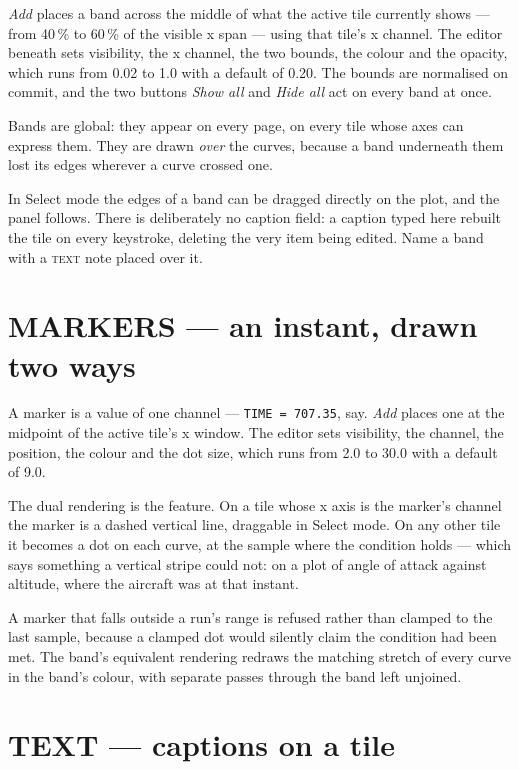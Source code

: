 \documentclass[11pt,a4paper,oneside]{report}
\newcommand{\code}[1]{\texttt{#1}}
\newcommand{\tab}[1]{\textsc{#1}}
\begin{document}
\emph{Add} places a band across the middle of what the active tile currently
shows --- from 40\,\% to 60\,\% of the visible x span --- using that tile's x
channel. The editor beneath sets visibility, the x channel, the two bounds, the
colour and the opacity, which runs from 0.02 to 1.0 with a default of 0.20. The
bounds are normalised on commit, and the two buttons \emph{Show all} and
\emph{Hide all} act on every band at once.

Bands are global: they appear on every page, on every tile whose axes can express
them. They are drawn \emph{over} the curves, because a band underneath them lost
its edges wherever a curve crossed one.

In Select mode the edges of a band can be dragged directly on the plot, and the
panel follows. There is deliberately no caption field: a caption typed here
rebuilt the tile on every keystroke, deleting the very item being edited. Name a
band with a \tab{text} note placed over it.

\section{MARKERS --- an instant, drawn two ways}

A marker is a value of one channel --- \code{TIME = 707.35}, say. \emph{Add}
places one at the midpoint of the active tile's x window. The editor sets
visibility, the channel, the position, the colour and the dot size, which runs
from 2.0 to 30.0 with a default of 9.0.

The dual rendering is the feature. On a tile whose x axis is the marker's channel
the marker is a dashed vertical line, draggable in Select mode. On any other tile
it becomes a dot on each curve, at the sample where the condition holds --- which
says something a vertical stripe could not: on a plot of angle of attack against
altitude, where the aircraft was at that instant.

A marker that falls outside a run's range is refused rather than clamped to the
last sample, because a clamped dot would silently claim the condition had been
met. The band's equivalent rendering redraws the matching stretch of every curve
in the band's colour, with separate passes through the band left unjoined.

\section{TEXT --- captions on a tile}
\end{document}
